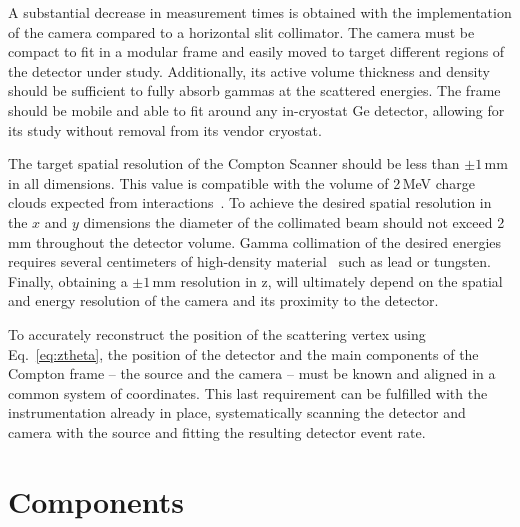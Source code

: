 A substantial decrease in measurement times is obtained with the implementation of the camera compared to a horizontal slit collimator. The camera must be compact to fit in a modular frame and easily moved to target different regions of the detector under study. Additionally, its active volume thickness and density should be sufficient to fully absorb gammas at the scattered energies. The frame should be mobile and able to fit around any in-cryostat Ge detector, allowing for its study without removal from its vendor cryostat. 

The target spatial resolution of the Compton Scanner should be less than $\pm1\,\text{mm}$ in all dimensions. This value is compatible with the volume of 2\,MeV charge clouds expected from \novbb{} interactions~\cite{Abt2007}. To achieve the desired spatial resolution in the $x$ and $y$ dimensions the diameter of the collimated beam should not exceed 2\,mm throughout the detector volume. Gamma collimation of the desired energies requires several centimeters of high-density material~\cite{Thoraeus1965} such as lead or tungsten. Finally, obtaining a $\pm1\,\text{mm}$ resolution in z, will ultimately depend on the spatial and energy resolution of the camera and its proximity to the detector. 

To accurately reconstruct the position of the scattering vertex using Eq.~\ref{eq:ztheta}, the position of the detector and the main components of the Compton frame -- the source and the camera -- must be known and aligned in a common system of coordinates. This last requirement can be fulfilled with the instrumentation already in place, systematically scanning the detector and camera with the source and fitting the resulting detector event rate.

\section{Components} \label{sec:components}

